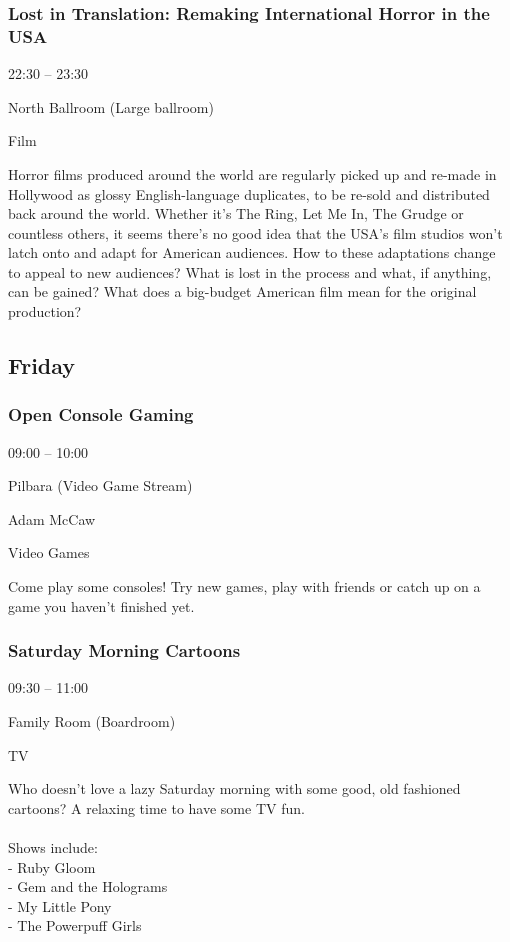\documentclass{scrreprt}
\begin{document}
\begin{multicols}{2}
\subsubsection*{Lost in Translation: Remaking International Horror in the USA}\begin{description}
\setlength{\itemsep}{0pt}
\setlength{\parsep}{0pt}
\setlength{\parskip}{0pt}
\item[Time:]{22:30 -- 23:30}
\item[Venue:]{North Ballroom (Large ballroom)}
\item[Tags:]{Film}\end{description}
Horror films produced around the world are regularly picked up and re-made in Hollywood as glossy English-language duplicates, to be re-sold and distributed back around the world. Whether it’s The Ring, Let Me In, The Grudge or countless others, it seems there’s no good idea that the USA’s film studios won’t latch onto and adapt for American audiences. How to these adaptations change to appeal to new audiences? What is lost in the process and what, if anything, can be gained? What does a big-budget American film mean for the original production?
\subsection*{Friday}\subsubsection*{Open Console Gaming}\begin{description}
\setlength{\itemsep}{0pt}
\setlength{\parsep}{0pt}
\setlength{\parskip}{0pt}
\item[Time:]{09:00 -- 10:00}
\item[Venue:]{Pilbara (Video Game Stream)}
\item[People:]{Adam McCaw}
\item[Tags:]{Video Games}\end{description}
Come play some consoles! Try new games, play with friends or catch up on a game you haven't finished yet.
\subsubsection*{Saturday Morning Cartoons}\begin{description}
\setlength{\itemsep}{0pt}
\setlength{\parsep}{0pt}
\setlength{\parskip}{0pt}
\item[Time:]{09:30 -- 11:00}
\item[Venue:]{Family Room (Boardroom)}
\item[Tags:]{TV}\end{description}
Who doesn't love a lazy Saturday morning with some good, old fashioned cartoons? A relaxing time to have some TV fun. \\\\Shows include:\\- Ruby Gloom\\- Gem and the Holograms\\- My Little Pony\\- The Powerpuff Girls

\end{multicols}
\end{document}
